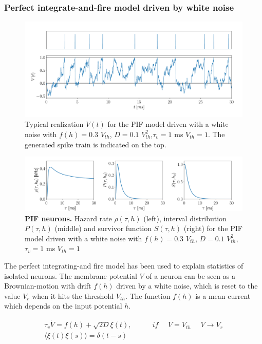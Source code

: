 \documentclass[12pt,twoside]{report}
\begin{document}
\subsubsection{Perfect integrate-and-fire model driven by white noise}
\label{sec:pif}


\begin{figure}[h!]
	\centering
	\includegraphics[width=0.8\linewidth]{PIF_V}
	\caption{Typical realization $V(t)$ for the PIF model driven with a white noise with  $f(h)=0.3$ $V_{th}$, $D=0.1$ $V_{th}^2$,$\tau_v=1$ ms $V_{th}=1$. The generated spike train is indicated on the top. 
	}
	\label{fig:PIFV}
\end{figure}


\begin{figure}[h!]
	
	\includegraphics[width=\linewidth]{inversegaussian.pdf}
	\caption{\textbf{PIF neurons.} Hazard rate $\rho(\tau,h)$ (left), interval distribution $P(\tau,h)$ (middle) and survivor function $S(\tau,h)$ (right) for the PIF model driven with a white noise with $f(h)=0.3$ $V_{th}$, $D=0.1$ $V_{th}^2$,$\tau_v=1$ ms $V_{th}=1$
	}
	\label{fig:inversegaussianprocess}
\end{figure}

The perfect integrating-and fire model has been used to explain statistics of isolated neurons. The membrane potential $V$ of a neuron can be seen as a Brownian-motion with drift $f(h)$ driven by a white noise, which is reset to the value $V_r$ when it hits the threshold $V_{th}$. The function $f(h)$ is a mean current which depends on the input potential $h$.

\begin{align}
\label{eq:Vxi}
\tau_v\dot V=f(h) +\sqrt{2D}\xi(t), \:\:\:\:\:\:\:\: \:\:\:\:\: if\:\:\:\:\:\:  V=V_{th}\:\:\:\:\:\:V\rightarrow V_r\\ 
\langle\xi(t)\xi(s)\rangle=\delta(t-s)
\end{align}
\end{document}
